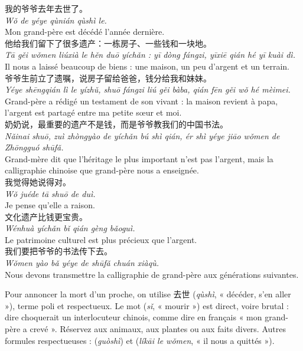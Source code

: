 \documentclass[11pt]{article}
\newcommand{\cle}[1]{{\popxbold\color{popdark}#1}}
\newcommand{\zh}[1]{\ifmmode\text{#1}\else{#1}\fi}
\begin{document}
\begin{textebox}
我的爷爷去年去世了。\\
\emph{Wǒ de yéye qùnián qùshì le.}\\
Mon grand-père est décédé l'année dernière.\\[4pt]
他给我们留下了很多遗产：一栋房子、一些钱和一块地。\\
\emph{Tā gěi wǒmen liúxià le hěn duō yíchǎn : yī dòng fángzi, yīxiē qián hé yī kuài dì.}\\
Il nous a laissé beaucoup de biens : une maison, un peu d'argent et un terrain.\\[4pt]
爷爷生前立了遗嘱，说房子留给爸爸，钱分给我和妹妹。\\
\emph{Yéye shēngqián lì le yízhǔ, shuō fángzi liú gěi bàba, qián fēn gěi wǒ hé mèimei.}\\
Grand-père a rédigé un testament de son vivant : la maison revient à papa, l'argent est partagé entre ma petite sœur et moi.\\[4pt]
奶奶说，最重要的遗产不是钱，而是爷爷教我们的中国书法。\\
\emph{Nǎinai shuō, zuì zhòngyào de yíchǎn bú shì qián, ér shì yéye jiāo wǒmen de Zhōngguó shūfǎ.}\\
Grand-mère dit que l'héritage le plus important n'est pas l'argent, mais la calligraphie chinoise que grand-père nous a enseignée.\\[4pt]
我觉得她说得对。\\
\emph{Wǒ juéde tā shuō de duì.}\\
Je pense qu'elle a raison.\\[4pt]
文化遗产比钱更宝贵。\\
\emph{Wénhuà yíchǎn bǐ qián gèng bǎoguì.}\\
Le patrimoine culturel est plus précieux que l'argent.\\[4pt]
我们要把爷爷的书法传下去。\\
\emph{Wǒmen yào bǎ yéye de shūfǎ chuán xiàqù.}\\
Nous devons transmettre la calligraphie de grand-père aux générations suivantes.
\end{textebox}

\begin{attention}
Pour annoncer la mort d'un proche, on utilise \cle{去世} (\emph{qùshì}, « décéder, s'en aller »), terme poli et respectueux. Le mot \zh{死} (\emph{sǐ}, « mourir ») est direct, voire brutal : dire \zh{我爷爷死了} choquerait un interlocuteur chinois, comme dire en français « mon grand-père a crevé ». Réservez \zh{死} aux animaux, aux plantes ou aux faits divers. Autres formules respectueuses : \zh{过世} (\emph{guòshì}) et \zh{离开了我们} (\emph{líkāi le wǒmen}, « il nous a quittés »).
\end{attention}
\end{document}
